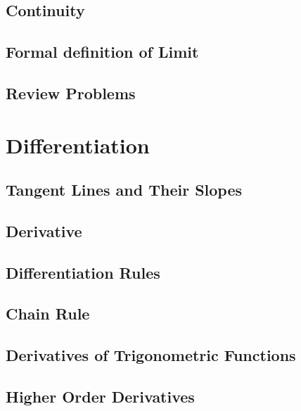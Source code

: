 \documentclass[12pt]{memoir}
\begin{document}
    \section{Continuity}
    
    \section{Formal definition of Limit}
    
    \section{Review Problems}
    
%     
%     


\chapter{Differentiation}
    \section{Tangent Lines and Their Slopes}
    
    \section{Derivative}
    
    \section{Differentiation Rules}
    
    \section{Chain Rule}
    
    \section{Derivatives of Trigonometric Functions}
    
    \section{Higher Order Derivatives}
    
\end{document}
